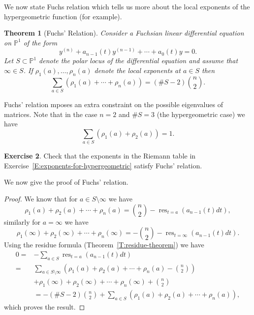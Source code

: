 \documentclass[]{book}
\numberwithin{equation}{section}
\newtheorem{theorem}{Theorem}[subsection]
\theoremstyle{definition}
\newtheorem{exercise}[theorem]{Exercise}
\theoremstyle{remark}
\newcommand{\PP}{\mathbb{P}}
\newcommand{\res}{\operatorname{res}}
\begin{document}
We now state Fuchs relation which tells us more about the local exponents of the hypergeometric function (for example).
\begin{theorem}[Fuchs' Relation]\label{T:fuchs-relation}
Consider a Fuchsian linear differential equation on $\PP^1$ of the form 
$$ y^{(n)} + a_{n-1}(t) y^{(n-1)} + \cdots + a_0(t) y =0.$$
Let $S \subset \PP^1$ denote the polar locus of the differential equation and assume that $\infty \in S$. 
If $\rho_1(a),\ldots,\rho_n(a)$ denote the local exponents at $a \in S$ then
$$ \sum_{a\in S} \left( \rho_1(a) + \cdots + \rho_n(a) \right) = (\#S-2){n \choose 2}.$$	
\end{theorem}

Fuchs' relation mposes an extra constraint on the possible eigenvalues of matrices. 
Note that in the case $n=2$ and $\# S=3$ (the hypergeometric case) we have 
$$ \sum_{a\in S}\left( \rho_1(a) + \rho_2(a) \right) =1.$$
\begin{exercise}
	Check that the exponents in the Riemann table in Exercise~\ref{E:exponents-for-hypergeometric} satisfy Fuchs' relation.
\end{exercise} 
We now give the proof of Fuchs' relation.

\begin{proof}
	We know that for $a \in S\setminus \infty$ we have 
	 $$ \rho_1(a) + \rho_2(a) + \cdots + \rho_n(a) = {n \choose 2} - \res_{t=a}(a_{n-1}(t)dt), $$
	similarly for $a =\infty$ we have 
	 $$ \rho_1(\infty) + \rho_2(\infty) + \cdots + \rho_n(\infty) = -{n \choose 2} - \res_{t=\infty}(a_{n-1}(t)dt).$$
	Using the residue formula (Theorem~\ref{T:residue-theorem}) we have 
	\begin{align*}
	  0=&- \sum_{a \in S} \res_{t=a}( a_{n-1}(t)dt) \\
	  =& \sum_{a\in S\setminus \infty}\left( \rho_1(a)+\rho_2(a) + \cdots + \rho_n(a) - {n\choose 2} \right) \\
	  & + \rho_1(\infty) + \rho_2(\infty) + \cdots + \rho_n(\infty) + {n \choose 2} \\
	  &= - (\#S -2){n \choose 2} + \sum_{a\in S}\left( \rho_1(a)+\rho_2(a) + \cdots + \rho_n(a) \right), 
	  \end{align*}
	  which proves the result. 
\end{proof}
\end{document}
